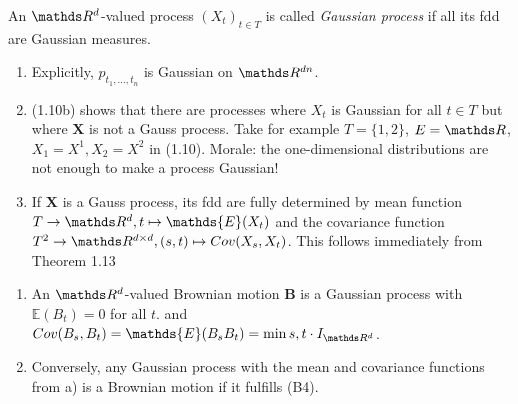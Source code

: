 \begin{defi}
An $\Rd$-valued process $(X_t)_{t \in T}$ is called \emph{Gaussian process} if all its fdd are Gaussian measures.
\end{defi}

\begin{bem}
\begin{enumerate}[label=\alph*)]
\item Explicitly, $p_{t_1,\dots , t_n}$ is Gaussian on $\R^{dn}$.
\item (1.10b) shows that there are processes where $X_t$ is Gaussian for all $t\in T$ but where $\textbf{X}$ is not a Gauss process. Take for example $T=\{1,2\}$, $E=\R$, $X_1=X^1,X_2=X^2$ in (1.10).
Morale: the one-dimensional distributions are not enough to make a process Gaussian!
\item If $\textbf{X}$ is a Gauss process, its fdd are fully determined by mean function $T \to \Rd, t \mapsto \mathds{E}(X_t)$ and the covariance function $T^2\to \R^{d\times d}, (s,t) \mapsto Cov(X_s,X_t)$.
This follows immediately from Theorem 1.13
\end{enumerate}
\end{bem}

\begin{thm}
\begin{enumerate}[label=\alph*)]
\item An $\Rd$-valued Brownian motion $\textbf{B}$ is a Gaussian process with $\mathds{E}(B_t)=0$ for all $t$.
and $Cov(B_s,B_t)=\mathds{E}(B_sB_t)=\min{s,t} \cdot I_{\Rd}$.
\item Conversely, any Gaussian process with the mean and covariance functions from a) is a Brownian motion if it fulfills (B4).
\end{enumerate}
\end{thm}

